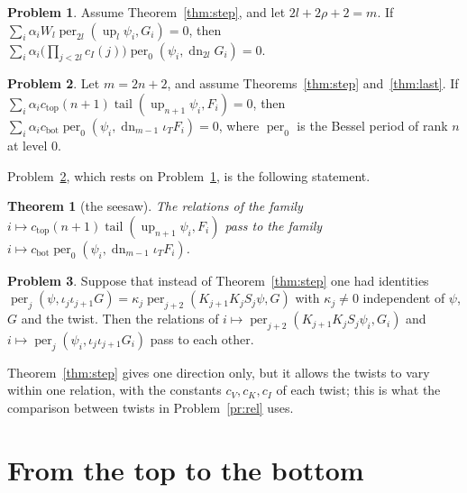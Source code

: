 \documentclass[reqno]{amsart}
\theoremstyle{definition}
\newtheorem{problem}{Problem}[section]
\theoremstyle{plain}
\newtheorem{theorem}{Theorem}[section]
\theoremstyle{remark}
\newcommand{\per}{\operatorname{per}}
\newcommand{\tail}{\operatorname{tail}}
\newcommand{\up}{\operatorname{up}}
\newcommand{\dn}{\operatorname{dn}}
\newcommand{\cTop}{c_{\mathrm{top}}}
\newcommand{\cBot}{c_{\mathrm{bot}}}
\begin{document}
\begin{problem}\label{pr:up}
Assume Theorem~\ref{thm:step}, and let \(2l+2\rho+2=m\).  If \(\sum_i\alpha_iW_l\per_{2l}(\up_l\psi_i,G_i)=0\), then \(\sum_i\alpha_i\bigl(\prod_{j<2l}c_I(j)\bigr)\per_0(\psi_i,\dn_{2l}G_i)=0\).
\end{problem}

\begin{problem}\label{pr:main}
Let \(m=2n+2\), and assume Theorems~\ref{thm:step} and~\ref{thm:last}.  If \(\sum_i\alpha_i\cTop(n+1)\tail(\up_{n+1}\psi_i,F_i)=0\), then \(\sum_i\alpha_i\cBot\per_0(\psi_i,\dn_{m-1}\iota_TF_i)=0\), where \(\per_0\) is the Bessel period of rank \(n\) at level \(0\).
\end{problem}

Problem~\ref{pr:main}, which rests on Problem~\ref{pr:up}, is the following statement.

\begin{theorem}[the seesaw]\label{thm:seesaw}
The relations of the family \(i\mapsto\cTop(n+1)\tail(\up_{n+1}\psi_i,F_i)\) pass to the family \(i\mapsto\cBot\per_0(\psi_i,\dn_{m-1}\iota_TF_i)\).
\end{theorem}

\begin{problem}\label{pr:identity-vs-relations}
Suppose that instead of Theorem~\ref{thm:step} one had identities \(\per_j(\psi,\iota_j\iota_{j+1}G)=\kappa_j\per_{j+2}(K_{j+1}K_jS_j\psi,G)\) with \(\kappa_j\ne0\) independent of \(\psi\), \(G\) and the twist.  Then the relations of \(i\mapsto\per_{j+2}(K_{j+1}K_jS_j\psi_i,G_i)\) and \(i\mapsto\per_j(\psi_i,\iota_j\iota_{j+1}G_i)\) pass to each other.
\end{problem}

Theorem~\ref{thm:step} gives one direction only, but it allows the twists to vary within one relation, with the constants \(c_V,c_K,c_I\) of each twist; this is what the comparison between twists in Problem~\ref{pr:rel} uses.

\section{From the top to the bottom}\label{sec:bottom}
\end{document}
